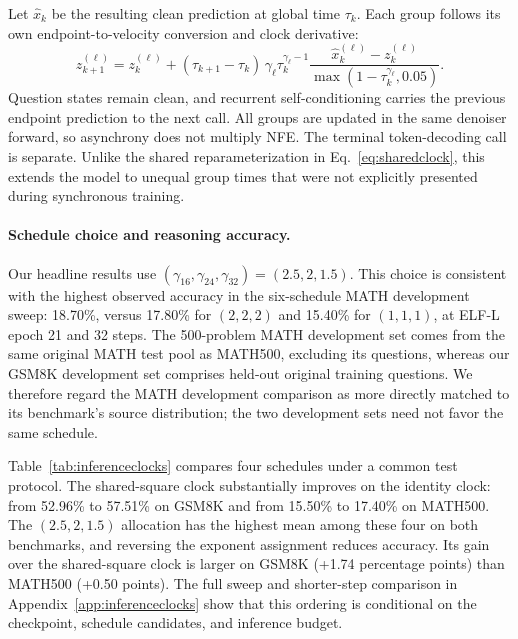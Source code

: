 Let $\widehat x_k$ be the resulting clean prediction at global time $\tau_k$. Each group follows its own endpoint-to-velocity conversion and clock derivative:
\begin{equation}
 z_{k+1}^{(\ell)}=z_k^{(\ell)}+
 (\tau_{k+1}-\tau_k)\,\gamma_\ell\tau_k^{\gamma_\ell-1}
 \frac{\widehat x_k^{(\ell)}-z_k^{(\ell)}}
 {\max(1-\tau_k^{\gamma_\ell},0.05)}.
 \label{eq:asyncsampler}
\end{equation}
Question states remain clean, and recurrent self-conditioning carries the previous endpoint prediction to the next call. All groups are updated in the same denoiser forward, so asynchrony does not multiply NFE. The terminal token-decoding call is separate. Unlike the shared reparameterization in Eq.~\eqref{eq:sharedclock}, this extends the model to unequal group times that were not explicitly presented during synchronous training.

\paragraph{Schedule choice and reasoning accuracy.}
Our headline results use $(\gamma_{16},\gamma_{24},\gamma_{32})=(2.5,2,1.5)$. This choice is consistent with the highest observed accuracy in the six-schedule MATH development sweep: 18.70\%, versus 17.80\% for $(2,2,2)$ and 15.40\% for $(1,1,1)$, at ELF-L epoch 21 and 32 steps. The 500-problem MATH development set comes from the same original MATH test pool as MATH500, excluding its questions, whereas our GSM8K development set comprises held-out original training questions. We therefore regard the MATH development comparison as more directly matched to its benchmark's source distribution; the two development sets need not favor the same schedule.



Table~\ref{tab:inferenceclocks} compares four schedules under a common test protocol. The shared-square clock substantially improves on the identity clock: from 52.96\% to 57.51\% on GSM8K and from 15.50\% to 17.40\% on MATH500. The $(2.5,2,1.5)$ allocation has the highest mean among these four on both benchmarks, and reversing the exponent assignment reduces accuracy. Its gain over the shared-square clock is larger on GSM8K (+1.74 percentage points) than MATH500 (+0.50 points). The full sweep and shorter-step comparison in Appendix~\ref{app:inferenceclocks} show that this ordering is conditional on the checkpoint, schedule candidates, and inference budget.

